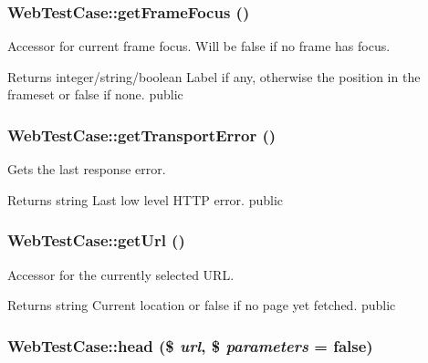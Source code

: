 \hypertarget{class_web_test_case_ab099bbb517810122d6a94889dc8541ad}{
\subsubsection[{getFrameFocus}]{\setlength{\rightskip}{0pt plus 5cm}WebTestCase::getFrameFocus ()}}
\label{class_web_test_case_ab099bbb517810122d6a94889dc8541ad}
Accessor for current frame focus. Will be false if no frame has focus. \begin{DoxyReturn}{Returns}
integer/string/boolean Label if any, otherwise the position in the frameset or false if none.  public 
\end{DoxyReturn}
\hypertarget{class_web_test_case_ac12566754888b2e6e3cee8290c2df04d}{
\subsubsection[{getTransportError}]{\setlength{\rightskip}{0pt plus 5cm}WebTestCase::getTransportError ()}}
\label{class_web_test_case_ac12566754888b2e6e3cee8290c2df04d}
Gets the last response error. \begin{DoxyReturn}{Returns}
string Last low level HTTP error.  public 
\end{DoxyReturn}
\hypertarget{class_web_test_case_aff8c47b2f6380af648711b8fbf82667e}{
\subsubsection[{getUrl}]{\setlength{\rightskip}{0pt plus 5cm}WebTestCase::getUrl ()}}
\label{class_web_test_case_aff8c47b2f6380af648711b8fbf82667e}
Accessor for the currently selected URL. \begin{DoxyReturn}{Returns}
string Current location or false if no page yet fetched.  public 
\end{DoxyReturn}
\hypertarget{class_web_test_case_af774376bbbcf017378dbec675015a760}{
\subsubsection[{head}]{\setlength{\rightskip}{0pt plus 5cm}WebTestCase::head (\$ {\em url}, \/  \$ {\em parameters} = {\ttfamily false})}}

